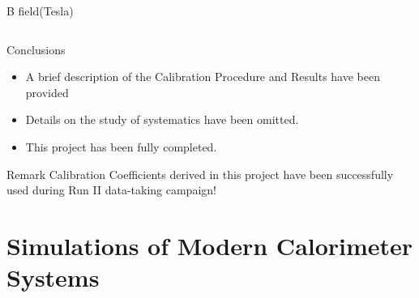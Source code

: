 \documentclass[pdf, 9pt]{beamer}
\begin{document}
\begin{frame}
\begin{columns}[T]
\begin{column}{0.5\textwidth}
\begin{center}
        \end{center}
        \begin{flushright}
          B field(Tesla)
        \end{flushright}
      \end{column}
    \end{columns}
  \end{frame}

  \begin{frame}{Conclusions}
    \begin{itemize}
      \item A brief description of the Calibration Procedure and Results have been provided
      \item Details on the study of systematics have been omitted.
      \item This project has been fully completed.
    \end{itemize}
    \begin{block}{Remark}
    \alert{Calibration Coefficients derived in this project have been successfully used during Run II data-taking campaign!}
    \end{block}
  \end{frame}

%
%
\section{Simulations of Modern Calorimeter Systems}
\end{document}
